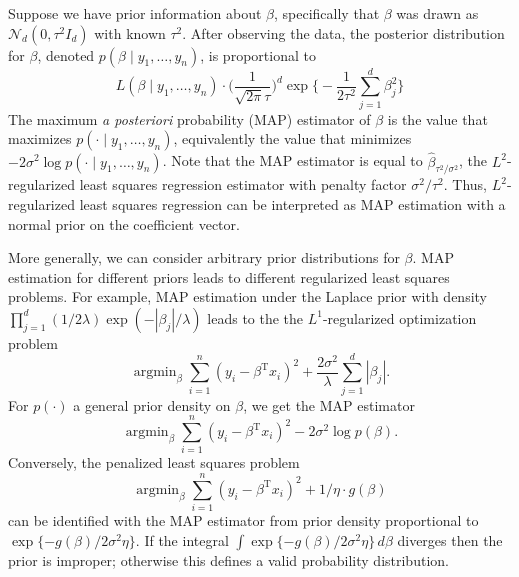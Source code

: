 \documentclass[11pt]{article}
\newcommand{\trans}{\mathrm{T}}
\newcommand{\Normal}[1][]{\mathcal{N}_{#1}}
\DeclareMathOperator*{\argmin}{argmin}
\begin{document}
Suppose we have prior information about $\beta$, specifically that $\beta$ was
drawn as $\Normal[d](0, \tau^2 I_d)$ with known $\tau^2$.  After observing the
data, the posterior distribution for $\beta$, denoted
$p(\beta \mid y_1, \ldots, y_n)$, is proportional to
\[
    L(\beta \mid y_1, \ldots, y_n)
    \cdot
    \Big(\frac{1}{\sqrt{2 \pi}\tau}\Big)^d
    \exp\Big\{ - \frac{1}{2 \tau^2} \sum_{j=1}^{d} \beta_j^2 \Big\}
\]
The maximum \textit{a posteriori} probability (MAP) estimator of $\beta$ is the
value that maximizes $p(\cdot \mid y_1, \ldots, y_n)$, equivalently the value
that minimizes $-2 \sigma^2 \log p(\cdot \mid y_1, \ldots, y_n)$.  Note that the
MAP estimator is equal to $\hat \beta_{\tau^2 / \sigma^2}$, the $L^2$-regularized
least squares regression estimator with penalty factor $\sigma^2/\tau^2$.  Thus,
$L^2$-regularized least squares regression can be interpreted as MAP estimation
with a normal prior on the coefficient vector.

More generally, we can consider arbitrary prior distributions for $\beta$.  MAP
estimation for different priors leads to different regularized least squares
problems.  For example, MAP estimation under the Laplace prior with density
$\prod_{j=1}^d (1/2\lambda) \exp(-|\beta_j|/\lambda)$ leads to
the the $L^1$-regularized optimization problem
\[
    \argmin_\beta
        \sum_{i=1}^{n}
            (y_i - \beta^\trans x_i)^2
        +
        \frac{2 \sigma^2}{\lambda}
        \sum_{j=1}^{d}
            |\beta_j|.
\]
For $p(\cdot)$ a general prior density on $\beta$, we get the MAP estimator
\[
    \argmin_\beta
        \sum_{i=1}^{n}
            (y_i - \beta^\trans x_i)^2
        -
        2 \sigma^2 \log p(\beta).
\]
Conversely, the penalized least squares problem
\[
    \argmin_\beta
        \sum_{i=1}^{n}
            (y_i - \beta^\trans x_i)^2
        +
        1/\eta \cdot g(\beta)
\]
can be identified with the MAP estimator from prior density proportional to
\(
    \exp\{ -g(\beta) / 2 \sigma^2 \eta \}.
\)
If the integral $\int  \exp\{ -g(\beta) / 2 \sigma^2 \eta \} \,d\beta$ diverges
then the prior is improper; otherwise this defines a valid probability distribution.
\end{document}

